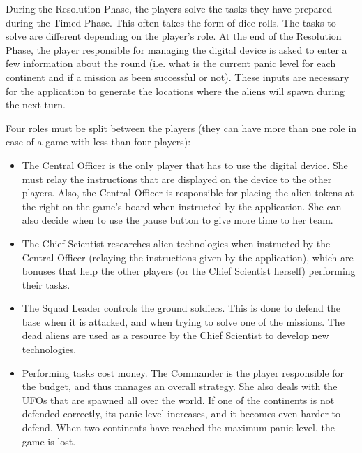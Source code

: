 During the Resolution Phase, the players solve the tasks they have prepared during the Timed Phase. This often takes the form of dice rolls. The tasks to solve are different depending on the player's role. At the end of the Resolution Phase, the player responsible for managing the digital device is asked to enter a few information about the round (i.e. what is the current panic level for each continent and if a mission as been successful or not). These inputs are necessary for the application to generate the locations where the aliens will spawn during the next turn. 

Four roles must be split between the players (they can have more than one role in case of a game with less than four players):

\begin{itemize}
\item The Central Officer is the only player that has to use the digital device. She must relay the instructions that are displayed on the device to the other players. Also, the Central Officer is responsible for placing the alien tokens at the right on the game's board when instructed by the application. She can also decide when to use the pause button to give more time to her team.
\item The Chief Scientist researches alien technologies when instructed by the Central Officer (relaying the instructions given by the application), which are bonuses that help the other players (or the Chief Scientist herself) performing their tasks.
\item The Squad Leader controls the ground soldiers. This is done to defend the base when it is attacked, and when trying to solve one of the missions. The dead aliens are used as a resource by the Chief Scientist to develop new technologies.
\item Performing tasks cost money. The Commander is the player responsible for the budget, and thus manages an overall strategy. She also deals with the UFOs that are spawned all over the world. If one of the continents is not defended correctly, its panic level increases, and it becomes even harder to defend. When two continents have reached the maximum panic level, the game is lost.
\end{itemize}

